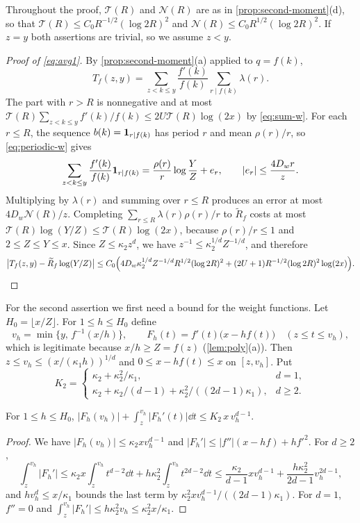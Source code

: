Throughout the proof, $\mathcal T(R)$ and $\mathcal N(R)$ are as in \cref{prop:second-moment}(d), so that $\mathcal T(R)\le C_0R^{-1/2}(\log2R)^2$ and $\mathcal N(R)\le C_0R^{1/2}(\log2R)^2$. If $z=y$ both assertions are trivial, so we assume $z<y$.

\begin{proof}[Proof of \eqref{eq:avg1}]
By \cref{prop:second-moment}(a) applied to $q=f(k)$,
\[
T_f(z,y)=\sum_{z<k\le y}\frac{f'(k)}{f(k)}\sum_{r\mid f(k)}\lambda(r).
\]
The part with $r>R$ is nonnegative and at most $\mathcal T(R)\sum_{z<k\le y}f'(k)/f(k)\le2U\mathcal T(R)\log(2x)$ by \eqref{eq:sum-w}. For each $r\le R$, the sequence $b(k)=\mathbf 1_{r\mid f(k)}$ has period $r$ and mean $\rho(r)/r$, so \eqref{eq:periodic-w} gives
\[
\sum_{z<k\le y}\frac{f'(k)}{f(k)}\mathbf 1_{r\mid f(k)}=\frac{\rho(r)}r\log\frac YZ+e_r,\qquad|e_r|\le\frac{4D_wr}z.
\]
Multiplying by $\lambda(r)$ and summing over $r\le R$ produces an error at most $4D_w\mathcal N(R)/z$. Completing $\sum_{r\le R}\lambda(r)\rho(r)/r$ to $\widetilde R_f$ costs at most $\mathcal T(R)\log(Y/Z)\le\mathcal T(R)\log(2x)$, because $\rho(r)/r\le1$ and $2\le Z\le Y\le x$. Since $Z\le\kappa_2z^d$, we have $z^{-1}\le\kappa_2^{1/d}Z^{-1/d}$, and therefore
\[
\bigl|T_f(z,y)-\widetilde R_f\log(Y/Z)\bigr|\le C_0\Bigl(4D_w\kappa_2^{1/d}Z^{-1/d}R^{1/2}(\log2R)^2+(2U+1)R^{-1/2}(\log2R)^2\log(2x)\Bigr).\qedhere
\]
\end{proof}

For the second assertion we first need a bound for the weight functions. Let $H_0=\lfloor x/Z\rfloor$. For $1\le h\le H_0$ define
\[
v_h=\min\{y,\,f^{-1}(x/h)\},\qquad F_h(t)=f'(t)\bigl(x-hf(t)\bigr)\quad(z\le t\le v_h),
\]
which is legitimate because $x/h\ge Z=f(z)$ (\cref{lem:poly}(a)). Then $z\le v_h\le(x/(\kappa_1h))^{1/d}$ and $0\le x-hf(t)\le x$ on $[z,v_h]$. Put
\[
K_2=\begin{cases}\kappa_2+\kappa_2^2/\kappa_1,&d=1,\\ \kappa_2+\kappa_2/(d-1)+\kappa_2^2/((2d-1)\kappa_1),&d\ge2.\end{cases}
\]

\begin{lemma}\label{lem:weight-var}
For $1\le h\le H_0$, $\displaystyle|F_h(v_h)|+\int_z^{v_h}|F_h'(t)|\dd t\le K_2\,x\,v_h^{d-1}$.
\end{lemma}

\begin{proof}
We have $|F_h(v_h)|\le\kappa_2xv_h^{d-1}$ and $|F_h'|\le|f''|(x-hf)+hf'^2$. For $d\ge2$,
\[
\int_z^{v_h}|F_h'|\le\kappa_2x\int_z^{v_h}t^{d-2}\dd t+h\kappa_2^2\int_z^{v_h}t^{2d-2}\dd t\le\frac{\kappa_2}{d-1}xv_h^{d-1}+\frac{h\kappa_2^2}{2d-1}v_h^{2d-1},
\]
and $hv_h^d\le x/\kappa_1$ bounds the last term by $\kappa_2^2xv_h^{d-1}/((2d-1)\kappa_1)$. For $d=1$, $f''=0$ and $\int_z^{v_h}|F_h'|\le h\kappa_2^2v_h\le\kappa_2^2x/\kappa_1$.
\end{proof}

